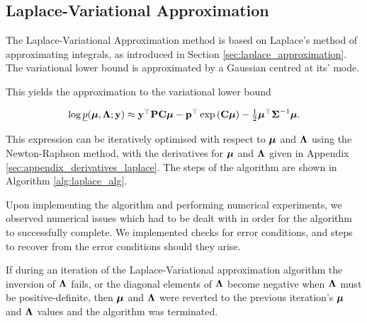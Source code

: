 \subsection{Laplace-Variational Approximation}
The Laplace-Variational Approximation method is based on Laplace's method of approximating integrals, as
introduced in Section \ref{sec:laplace_approximation}. The variational lower bound  is approximated by a
Gaussian centred at its' mode.

This yields the approximation to the variational lower bound

\begin{equation}
\begin{array}{ll}
	\log \underline{p}({\boldsymbol \mu}, {\boldsymbol \Lambda}; {\bf y}) \approx {\bf y}^\top{\bf P}{\bf C}{\boldsymbol\mu} - {\bf p}^\top\exp \left ({\bf C} {\boldsymbol \mu} \right ) - \tfrac{1}{2} {\boldsymbol \mu}^\top {\boldsymbol\Sigma}^{-1} {\boldsymbol \mu}. 
\end{array}
\end{equation}
		
\noindent This expression can be iteratively optimised with respect to ${\boldsymbol \mu}$ and ${\boldsymbol \Lambda}$ using the
Newton-Raphson method, with the derivatives for ${\boldsymbol \mu}$ and ${\boldsymbol \Lambda}$ given in Appendix
\ref{sec:appendix_derivatives_laplace}. The steps of the algorithm are shown in Algorithm \ref{alg:laplace_alg}.
		
Upon implementing the algorithm and performing numerical experiments, we observed numerical issues which had to be dealt with in 
order for the algorithm to successfully complete.
We implemented checks for error conditions, and steps to recover from the error conditions should
they arise.

If during an iteration of the Laplace-Variational approximation algorithm the inversion  of ${\boldsymbol \Lambda}$
fails, or the diagonal elements of ${\boldsymbol \Lambda}$ become negative when ${\boldsymbol \Lambda}$ must be positive-definite,
then ${\boldsymbol \mu}$ and ${\boldsymbol \Lambda}$ were reverted to the previous iteration's ${\boldsymbol \mu}$ and ${\boldsymbol \Lambda}$ values and
the algorithm was terminated.

